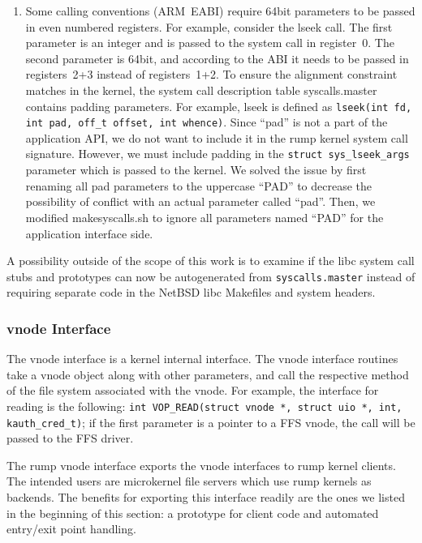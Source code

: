 \begin{enumerate}
\item   Some calling conventions (\eg ARM~EABI) require
	64bit parameters to be passed in even numbered registers.
	For example, consider the lseek call.  The first parameter
	is an integer and is passed to the system call in register~0.
	The second parameter is 64bit, and according to the ABI
	it needs to be passed in registers~2+3 instead of registers~1+2.
	To ensure the alignment constraint matches in the kernel,
	the system call description table syscalls.master contains
	padding parameters.  For example, lseek is defined as
	\verb+lseek(int fd, int pad, off_t offset, int whence)+.
	Since ``pad'' is not a part of the application API, we
	do not want to include it in the rump kernel system call
	signature.  However, we must include padding in the
	\verb+struct sys_lseek_args+ parameter which is passed to
	the kernel.  We solved the issue by first renaming all pad
	parameters to the uppercase ``PAD'' to decrease the
	possibility of conflict with an actual parameter called
	``pad''.  Then, we modified makesyscalls.sh to ignore all
	parameters named ``PAD'' for the application interface
	side.
\end{enumerate}

A possibility outside of the scope of this work is to examine if
the libc system call stubs and prototypes can now be autogenerated
from \texttt{syscalls.master} instead of requiring separate code
in the NetBSD libc Makefiles and system headers.

\subsubsection{vnode Interface}

The vnode interface is a kernel internal interface.  The vnode
interface routines take a vnode object along with other parameters,
and call the respective method of the file system associated with
the vnode.  For example, the interface for reading is the following:
\verb+int VOP_READ(struct vnode *, struct uio *, int, kauth_cred_t)+;
if the first parameter is a pointer to a FFS vnode, the call will be
passed to the FFS driver.

The rump vnode interface exports the vnode interfaces
to rump kernel clients.  The intended users are microkernel file servers
which use rump kernels as backends.  The benefits for
exporting this interface readily are the ones we listed in the
beginning of this section: a prototype for client code and
automated entry/exit point handling.

